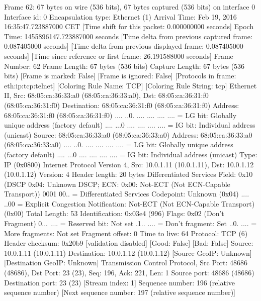 Frame 62: 67 bytes on wire (536 bits), 67 bytes captured (536 bits) on interface 0
    Interface id: 0
    Encapsulation type: Ethernet (1)
    Arrival Time: Feb 19, 2016 16:35:47.723887000 CET
    [Time shift for this packet: 0.000000000 seconds]
    Epoch Time: 1455896147.723887000 seconds
    [Time delta from previous captured frame: 0.087405000 seconds]
    [Time delta from previous displayed frame: 0.087405000 seconds]
    [Time since reference or first frame: 26.191588000 seconds]
    Frame Number: 62
    Frame Length: 67 bytes (536 bits)
    Capture Length: 67 bytes (536 bits)
    [Frame is marked: False]
    [Frame is ignored: False]
    [Protocols in frame: eth:ip:tcp:telnet]
    [Coloring Rule Name: TCP]
    [Coloring Rule String: tcp]
Ethernet II, Src: 68:05:ca:36:33:a0 (68:05:ca:36:33:a0), Dst: 68:05:ca:36:31:f0 (68:05:ca:36:31:f0)
    Destination: 68:05:ca:36:31:f0 (68:05:ca:36:31:f0)
        Address: 68:05:ca:36:31:f0 (68:05:ca:36:31:f0)
        .... ..0. .... .... .... .... = LG bit: Globally unique address (factory default)
        .... ...0 .... .... .... .... = IG bit: Individual address (unicast)
    Source: 68:05:ca:36:33:a0 (68:05:ca:36:33:a0)
        Address: 68:05:ca:36:33:a0 (68:05:ca:36:33:a0)
        .... ..0. .... .... .... .... = LG bit: Globally unique address (factory default)
        .... ...0 .... .... .... .... = IG bit: Individual address (unicast)
    Type: IP (0x0800)
Internet Protocol Version 4, Src: 10.0.1.11 (10.0.1.11), Dst: 10.0.1.12 (10.0.1.12)
    Version: 4
    Header length: 20 bytes
    Differentiated Services Field: 0x10 (DSCP 0x04: Unknown DSCP; ECN: 0x00: Not-ECT (Not ECN-Capable Transport))
        0001 00.. = Differentiated Services Codepoint: Unknown (0x04)
        .... ..00 = Explicit Congestion Notification: Not-ECT (Not ECN-Capable Transport) (0x00)
    Total Length: 53
    Identification: 0x03e4 (996)
    Flags: 0x02 (Don't Fragment)
        0... .... = Reserved bit: Not set
        .1.. .... = Don't fragment: Set
        ..0. .... = More fragments: Not set
    Fragment offset: 0
    Time to live: 64
    Protocol: TCP (6)
    Header checksum: 0x20b9 [validation disabled]
        [Good: False]
        [Bad: False]
    Source: 10.0.1.11 (10.0.1.11)
    Destination: 10.0.1.12 (10.0.1.12)
    [Source GeoIP: Unknown]
    [Destination GeoIP: Unknown]
Transmission Control Protocol, Src Port: 48686 (48686), Dst Port: 23 (23), Seq: 196, Ack: 221, Len: 1
    Source port: 48686 (48686)
    Destination port: 23 (23)
    [Stream index: 1]
    Sequence number: 196    (relative sequence number)
    [Next sequence number: 197    (relative sequence number)]
